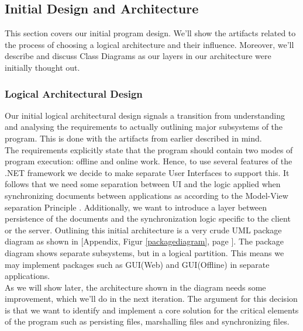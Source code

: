 \subsection{Initial Design and Architecture}
This section covers our initial program design. We'll show the artifacts related to the process of choosing a logical architecture and their influence. Moreover, we'll describe and discuss Class Diagrams as our layers in our architecture were initially thought out. 
\subsubsection{Logical Architectural Design}
Our initial logical architectural design signals a transition from understanding and analysing the requirements to actually outlining major subsystems of the program. This is done with the artifacts from earlier described in mind.\\
The requirements explicitly state that the program should contain two modes of program execution: offline and online work. Hence, to use several features of the .NET framework we decide to make separate User Interfaces to support this. It follows that we need some separation between UI and the logic applied when synchronizing documents between applications as according to the Model-View separation Principle \cite[p.~209]{OOAD}. Additionally, we want to introduce a layer between persistence of the documents and the synchronization logic specific to the client or the server. Outlining this initial architecture is a very crude UML package diagram as shown in [Appendix, Figur \ref{packagediagram}, page \pageref{packagediagram}].
The package diagram shows separate subsystems, but in a logical partition. This means we may implement packages such as GUI(Web) and GUI(Offline) in separate applications.\\
As we will show later, the architecture shown in the diagram needs some improvement, which we'll do in the next iteration. The argument for this decision is that we want to identify and implement a core solution for the critical elements of the program such as persisting files, marshalling files and synchronizing files.\\
